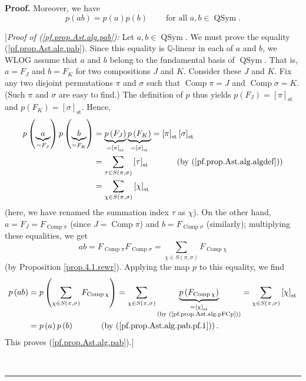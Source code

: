 \documentclass[numbers=enddot,12pt,final,onecolumn,notitlepage]{scrartcl}%
\theoremstyle{definition}
\newenvironment{proof}[1][Proof]{\noindent\textbf{#1.} }{\ \rule{0.5em}{0.5em}}
\let\sumnonlimits\sum
\renewcommand{\sum}{\sumnonlimits\limits}
\begin{document}
\begin{proof}
Moreover, we have%
\begin{equation}
p\left(  ab\right)  =p\left(  a\right)  p\left(  b\right)
\ \ \ \ \ \ \ \ \ \ \text{for all }a,b\in\operatorname*{QSym}.
\label{pf.prop.Ast.alg.pab}%
\end{equation}


[\textit{Proof of (\ref{pf.prop.Ast.alg.pab}):} Let $a,b\in
\operatorname*{QSym}$. We must prove the equality (\ref{pf.prop.Ast.alg.pab}).
Since this equality is $\mathbb{Q}$-linear in each of $a$ and $b$, we WLOG
assume that $a$ and $b$ belong to the fundamental basis of
$\operatorname*{QSym}$. That is, $a=F_{J}$ and $b=F_{K}$ for two compositions
$J$ and $K$. Consider these $J$ and $K$. Fix any two disjoint permutations
$\pi$ and $\sigma$ such that $\operatorname*{Comp}\pi=J$ and
$\operatorname*{Comp}\sigma=K$. (Such $\pi$ and $\sigma$ are easy to find.)
The definition of $p$ thus yields $p\left(  F_{J}\right)  =\left[  \pi\right]
_{\operatorname*{st}}$ and $p\left(  F_{K}\right)  =\left[  \sigma\right]
_{\operatorname*{st}}$. Hence,%
\begin{align}
p\left(  \underbrace{a}_{=F_{J}}\right)  p\left(  \underbrace{b}_{=F_{K}%
}\right)   &  =\underbrace{p\left(  F_{J}\right)  }_{=\left[  \pi\right]
_{\operatorname*{st}}}\underbrace{p\left(  F_{K}\right)  }_{=\left[
\sigma\right]  _{\operatorname*{st}}}=\left[  \pi\right]  _{\operatorname*{st}%
}\left[  \sigma\right]  _{\operatorname*{st}}\nonumber\\
&  =\sum_{\tau\in S\left(  \pi,\sigma\right)  }\left[  \tau\right]
_{\operatorname*{st}}\ \ \ \ \ \ \ \ \ \ \left(  \text{by
(\ref{pf.prop.Ast.alg.algdef})}\right) \nonumber\\
&  =\sum_{\chi\in S\left(  \pi,\sigma\right)  }\left[  \chi\right]
_{\operatorname*{st}} \label{pf.prop.Ast.alg.pab.pf.1}%
\end{align}
(here, we have renamed the summation index $\tau$ as $\chi$). On the other
hand, $a=F_{J}=F_{\operatorname*{Comp}\pi}$ (since $J=\operatorname*{Comp}\pi
$) and $b=F_{\operatorname*{Comp}\sigma}$ (similarly); multiplying these
equalities, we get%
\[
ab=F_{\operatorname*{Comp}\pi}F_{\operatorname*{Comp}\sigma}=\sum_{\chi\in
S\left(  \pi,\sigma\right)  }F_{\operatorname*{Comp}\chi}%
\]
(by Proposition \ref{prop.4.1.rewr}). Applying the map $p$ to this equality,
we find%
\begin{align*}
p\left(  ab\right)   &  =p\left(  \sum_{\chi\in S\left(  \pi,\sigma\right)
}F_{\operatorname*{Comp}\chi}\right)  =\sum_{\chi\in S\left(  \pi
,\sigma\right)  }\underbrace{p\left(  F_{\operatorname*{Comp}\chi}\right)
}_{\substack{=\left[  \chi\right]  _{\operatorname*{st}}\\\text{(by
(\ref{pf.prop.Ast.alg.pFCp}))}}}=\sum_{\chi\in S\left(  \pi,\sigma\right)
}\left[  \chi\right]  _{\operatorname*{st}}\\
&  =p\left(  a\right)  p\left(  b\right)  \ \ \ \ \ \ \ \ \ \ \left(  \text{by
(\ref{pf.prop.Ast.alg.pab.pf.1})}\right)  .
\end{align*}
This proves (\ref{pf.prop.Ast.alg.pab}).]


\end{proof}
\end{document}
